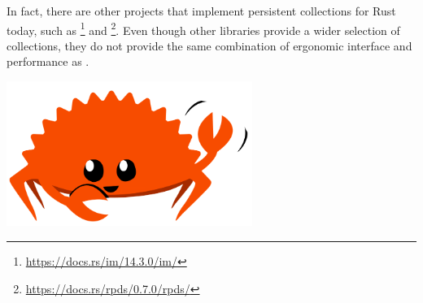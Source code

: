 In fact, there are other projects that implement persistent collections for Rust today, such as \imrs{}\footnote{\url{https://docs.rs/im/14.3.0/im/}} and \rpds{}\footnote{\url{https://docs.rs/rpds/0.7.0/rpds/}}. Even though other libraries provide a wider selection of collections, they do not provide the same combination of ergonomic interface and performance as \pvecrs{}.


\begin{center}
    \vspace*{1cm}
    \includegraphics[width=8cm, angle=0, trim=10 10 10 10, clip]{images/ferris-waving.png}
\end{center}
